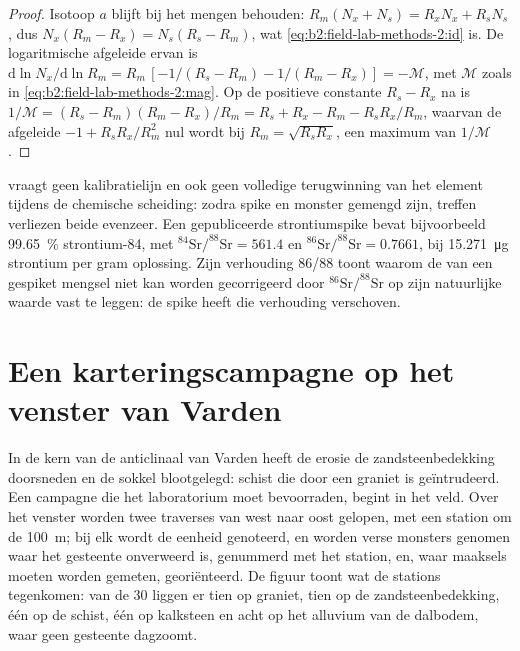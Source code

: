 \begin{proof}
Isotoop $a$ blijft bij het mengen behouden: $R_m(N_x + N_s) = R_x N_x + R_s N_s$, dus $N_x(R_m - R_x) =
N_s(R_s - R_m)$, wat \eqref{eq:b2:field-lab-methods-2:id} is. De logaritmische afgeleide ervan is
$\mathrm{d}\ln N_x/\mathrm{d}\ln R_m = R_m\,[-1/(R_s - R_m) - 1/(R_m - R_x)] = -\mathcal{M}$, met
$\mathcal{M}$ zoals in \eqref{eq:b2:field-lab-methods-2:mag}. Op de positieve constante $R_s - R_x$ na is
$1/\mathcal{M} = (R_s - R_m)(R_m - R_x)/R_m = R_s + R_x - R_m - R_sR_x/R_m$, waarvan de afgeleide
$-1 + R_sR_x/R_m^2$ nul wordt bij $R_m = \sqrt{R_sR_x}$, een maximum van $1/\mathcal{M}$.
\end{proof}

 vraagt geen kalibratielijn en ook geen volledige terugwinning van het element tijdens
de chemische scheiding: zodra spike en monster gemengd zijn, treffen verliezen beide evenzeer. Een gepubliceerde
strontiumspike bevat bijvoorbeeld \qty{99.65}{\percent} strontium-84, met
$^{84}\mathrm{Sr}/^{88}\mathrm{Sr} = 561.4$ en $^{86}\mathrm{Sr}/^{88}\mathrm{Sr} = 0.7661$, bij
\qty{15.271}{\micro\gram} strontium per gram oplossing. Zijn verhouding 86/88 toont waarom de
 van een gespiket mengsel niet kan worden gecorrigeerd door $^{86}\mathrm{Sr}/^{88}\mathrm{Sr}$ op zijn
natuurlijke waarde vast te leggen: de spike heeft die verhouding verschoven.

\section{Een karteringscampagne op het venster van Varden}\label{sec:b2:field-lab-methods-2:campaign}

In de kern van de anticlinaal van Varden heeft de erosie de zandsteenbedekking doorsneden en de sokkel
blootgelegd: schist die door een graniet is geïntrudeerd. Een campagne die het laboratorium moet bevoorraden, begint in het
veld. Over het venster worden twee traverses van west naar oost gelopen, met een station om de
\qty{100}{m}; bij elk wordt de eenheid genoteerd, en worden verse monsters genomen waar het gesteente
onverweerd is, genummerd met het station, en, waar maaksels moeten worden gemeten, georiënteerd. De figuur
toont wat de stations tegenkomen: van de 30 liggen er tien op graniet, tien op de zandsteenbedekking, één op
de schist, één op kalksteen en acht op het alluvium van de dalbodem, waar geen gesteente
dagzoomt.

